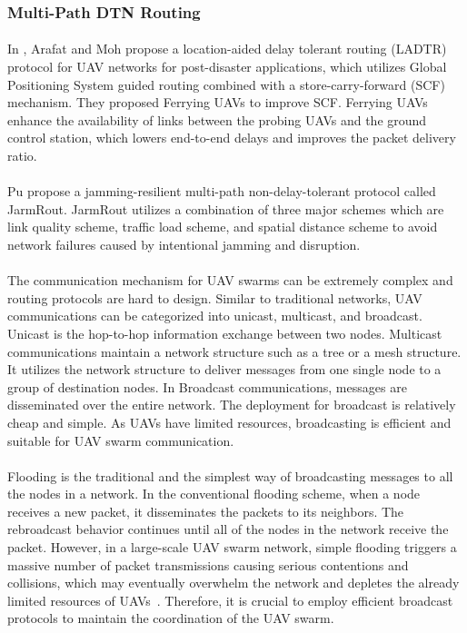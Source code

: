 \documentclass[a4paper,12pt]{report}
\begin{document}
\subsubsection{Multi-Path DTN Routing}
\paragraph{}
In \cite{8490824}, Arafat and Moh propose a location-aided delay tolerant routing (LADTR) protocol for UAV networks for post-disaster applications, which utilizes Global Positioning System guided routing combined with a store-carry-forward (SCF) mechanism. They proposed Ferrying UAVs to improve SCF.  Ferrying UAVs enhance the availability of links between the probing UAVs and the ground control station, which lowers end-to-end delays and improves the packet delivery ratio\cite{8490824}. 

\paragraph{}
Pu \cite{8523684} propose a jamming-resilient multi-path non-delay-tolerant protocol called JarmRout. JarmRout utilizes a combination of three major schemes which are link quality scheme, traffic load scheme, and spatial distance scheme to avoid network failures caused by intentional jamming and disruption.

\paragraph{}
The communication mechanism for UAV swarms can be extremely complex and routing protocols are hard to design. Similar to traditional networks, UAV communications can be categorized into unicast, multicast, and broadcast. Unicast is the hop-to-hop information exchange between two nodes. Multicast communications maintain a network structure such as a tree or a mesh structure. It utilizes the network structure to deliver messages from one single node to a group of destination nodes. In Broadcast communications, messages are disseminated over the entire network. The deployment for broadcast is relatively cheap and simple. As UAVs have limited resources, broadcasting is efficient and suitable for UAV swarm communication. 

\paragraph{}
Flooding is the traditional and the simplest way of broadcasting messages to all the nodes in a network\cite{flooding}. In the conventional flooding scheme, when a node receives a new packet, it disseminates the packets to its neighbors. The rebroadcast behavior continues until all of the nodes in the network receive the packet. However, in a large-scale UAV swarm network, simple flooding triggers a massive number of packet transmissions causing serious contentions and collisions, which may eventually overwhelm the network and depletes the already limited resources of UAVs~\cite{tseng2002broadcast}. Therefore, it is crucial to employ efficient broadcast protocols to maintain the coordination of the UAV swarm. 
\end{document}
